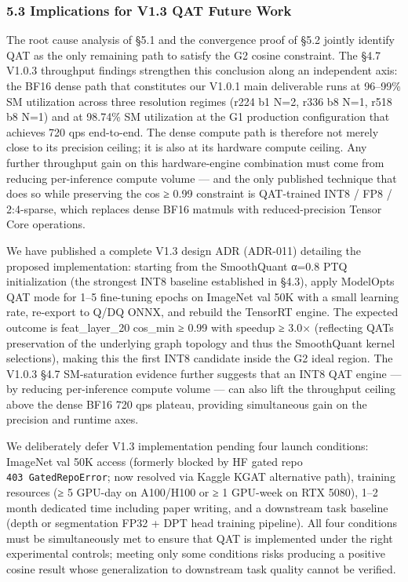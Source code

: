 \documentclass[
]{article}
\begin{document}
\subsubsection{5.3 Implications for V1.3 QAT Future
Work}\label{53-implications-for-v13-qat-future-work}

The root cause analysis of §5.1 and the convergence proof of §5.2
jointly identify QAT as the only remaining path to satisfy the G2 cosine
constraint. The §4.7 V1.0.3 throughput findings strengthen this
conclusion along an independent axis: the BF16 dense path that
constitutes our V1.0.1 main deliverable runs at 96--99\% SM utilization
across three resolution regimes (r224 b1 N=2, r336 b8 N=1, r518 b8 N=1)
and at 98.74\% SM utilization at the G1 production configuration that
achieves 720 qps end-to-end. The dense compute path is therefore not
merely close to its precision ceiling; it is also at its hardware
compute ceiling. Any further throughput gain on this hardware-engine
combination must come from reducing per-inference compute volume --- and
the only published technique that does so while preserving the cos ≥
0.99 constraint is QAT-trained INT8 / FP8 / 2:4-sparse, which replaces
dense BF16 matmuls with reduced-precision Tensor Core operations.

We have published a complete V1.3 design ADR (ADR-011) detailing the
proposed implementation: starting from the SmoothQuant α=0.8 PTQ
initialization (the strongest INT8 baseline established in §4.3), apply
ModelOpt\textquotesingle s QAT mode for 1--5 fine-tuning epochs on
ImageNet val 50K with a small learning rate, re-export to Q/DQ ONNX, and
rebuild the TensorRT engine. The expected outcome is feat\_layer\_20
cos\_min ≥ 0.99 with speedup ≥ 3.0× (reflecting QAT\textquotesingle s
preservation of the underlying graph topology and thus the SmoothQuant
kernel selections), making this the first INT8 candidate inside the G2
ideal region. The V1.0.3 §4.7 SM-saturation evidence further suggests
that an INT8 QAT engine --- by reducing per-inference compute volume ---
can also lift the throughput ceiling above the dense BF16 720 qps
plateau, providing simultaneous gain on the precision and runtime axes.

We deliberately defer V1.3 implementation pending four launch
conditions: ImageNet val 50K access (formerly blocked by HF gated repo
\texttt{403\ GatedRepoError}; now resolved via Kaggle KGAT alternative
path), training resources (≥ 5 GPU-day on A100/H100 or ≥ 1 GPU-week on
RTX 5080), 1--2 month dedicated time including paper writing, and a
downstream task baseline (depth or segmentation FP32 + DPT head training
pipeline). All four conditions must be simultaneously met to ensure that
QAT is implemented under the right experimental controls; meeting only
some conditions risks producing a positive cosine result whose
generalization to downstream task quality cannot be verified.
\end{document}
